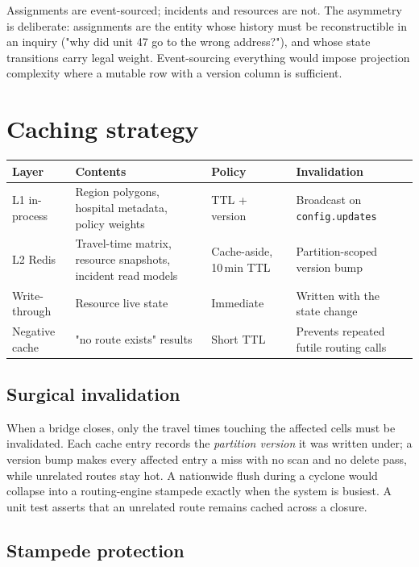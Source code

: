 Assignments are event-sourced; incidents and resources are not. The asymmetry
is deliberate: assignments are the entity whose history must be reconstructible
in an inquiry ("why did unit 47 go to the wrong address?"), and whose state
transitions carry legal weight. Event-sourcing everything would impose
projection complexity where a mutable row with a version column is sufficient.

\section{Caching strategy}

\begin{center}\footnotesize
\begin{tabular}{@{}lp{34mm}p{30mm}p{34mm}@{}}
\toprule
\textbf{Layer} & \textbf{Contents} & \textbf{Policy} & \textbf{Invalidation} \\
\midrule
L1 in-process & Region polygons, hospital metadata, policy weights & TTL + version & Broadcast on \texttt{config.updates} \\
L2 Redis & Travel-time matrix, resource snapshots, incident read models & Cache-aside, 10\,min TTL & Partition-scoped version bump \\
Write-through & Resource live state & Immediate & Written with the state change \\
Negative cache & "no route exists" results & Short TTL & Prevents repeated futile routing calls \\
\bottomrule
\end{tabular}
\end{center}

\subsection{Surgical invalidation}

When a bridge closes, only the travel times touching the affected cells must be
invalidated. Each cache entry records the \emph{partition version} it was
written under; a version bump makes every affected entry a miss with no scan
and no delete pass, while unrelated routes stay hot. A nationwide flush during
a cyclone would collapse into a routing-engine stampede exactly when the system
is busiest. A unit test asserts that an unrelated route remains cached across a
closure.

\subsection{Stampede protection}

